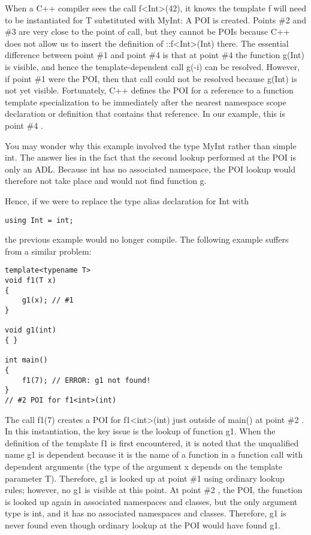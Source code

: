 When a C++ compiler sees the call f<Int>(42), it knows the template f will need to be instantiated for T substituted with MyInt: A POI is created. Points \#2 and \#3 are very close to the point of call, but they cannot be POIs because C++ does not allow us to insert the definition of ::f<Int>(Int) there. The essential difference between point \#1 and point \#4 is that at point \#4 the function g(Int) is visible, and hence the template-dependent call g(-i) can be resolved. However, if point \#1 were the POI, then that call could not be resolved because g(Int) is not yet visible. Fortunately, C++ defines the POI for a reference to a function template specialization to be immediately after the nearest namespace scope declaration or definition that contains that reference. In our example, this is point \#4 .

You may wonder why this example involved the type MyInt rather than simple int. The answer lies in the fact that the second lookup performed at the POI is only an ADL. Because int has no associated namespace, the POI lookup would therefore not take place and would not find function g.

Hence, if we were to replace the type alias declaration for Int with

\begin{lstlisting}[style=styleCXX]
using Int = int;
\end{lstlisting}

the previous example would no longer compile. The following example suffers from a similar problem:

\begin{lstlisting}[style=styleCXX]
template<typename T>
void f1(T x)
{
	g1(x); // #1
}

void g1(int)
{ }

int main()
{
	f1(7); // ERROR: g1 not found!
}
// #2 POI for f1<int>(int)
\end{lstlisting}

The call f1(7) creates a POI for f1<int>(int) just outside of main() at point \#2 . In this instantiation, the key issue is the lookup of function g1. When the definition of the template f1 is first encountered, it is noted that the unqualified name g1 is dependent because it is the name of a function in a function call with dependent arguments (the type of the argument x depends on the template parameter T). Therefore, g1 is looked up at point \#1 using ordinary lookup rules; however, no g1 is visible at this point. At point \#2 , the POI, the function is looked up again in associated namespaces and classes, but the only argument type is int, and it has no associated namespaces and classes. Therefore, g1 is never found even though ordinary lookup at the POI would have found g1.

